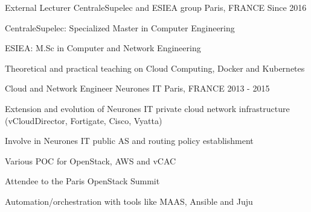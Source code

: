 \begin{cventries}
  \cventry
    {External Lecturer} %
    {CentraleSupelec and ESIEA group}
    {Paris, FRANCE} %
    {Since 2016} %
    {
      \begin{cvitems} %
        \item {CentraleSupelec: Specialized Master in Computer Engineering}
        \item {ESIEA: M.Sc in Computer and Network Engineering}
        \item {Theoretical and practical teaching on Cloud Computing, Docker
          and Kubernetes}
      \end{cvitems}
    }
  \cventry
    {Cloud and Network Engineer}
    {Neurones IT} %
    {Paris, FRANCE} %
    {2013 - 2015} %
    {
      \begin{cvitems} %
        \item {Extension and evolution of Neurones IT private cloud
          network infrastructure (vCloudDirector, Fortigate, Cisco, Vyatta)}
        \item {Involve in Neurones IT public AS and routing policy
          establishment}
        \item {Various POC for OpenStack, AWS and vCAC}
        \item {Attendee to the Paris OpenStack Summit}
        \item {Automation/orchestration with tools like MAAS, Ansible and Juju}
      \end{cvitems}
    }

\end{cventries}
